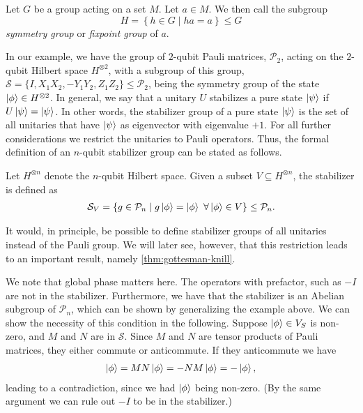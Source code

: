 \begin{defn}\label{defn:fixpointgroup}
  Let $G$ be a group acting on a set $M$. Let $a\in M$. We then call the
  subgroup
  \[ H = \left\{ h \in G \mid ha = a \right\} \leq G \]
  \emph{symmetry group} or \emph{fixpoint group} of $a$.
\end{defn}

In our example, we have the group of $2$-qubit Pauli matrices, $\mathcal{P}_2$,
acting on the $2$-qubit Hilbert space $H^{\otimes 2}$, with a subgroup of this
group, $\mathcal{S} = \{I, X_1X_2, -Y_1Y_2, Z_1Z_2\} \leq \mathcal{P}_2$, being
the symmetry group of the state $\ket{\phi} \in H^{\otimes 2}$.
In general, we say that a unitary $U$ stabilizes a pure state $\ket{\psi}$ if
$U\ket{\psi} = \ket{\psi}$. In other words, the stabilizer group of a pure
state
$\ket{\psi}$ is the set of all unitaries that have $\ket{\psi}$ as eigenvector
with eigenvalue $+1$. For all further considerations we restrict the unitaries
to Pauli operators. Thus, the formal definition of an $n$-qubit stabilizer
group can be stated as follows.

\begin{defn}\label{defn:stabilizergroup}
  Let $H^{\otimes n}$ denote the $n$-qubit Hilbert space. Given a subset $V
  \subseteq H^{\otimes n}$, the stabilizer is defined as
  \begin{align}
    \mathcal{S}_V = \{ g \in \mathcal{P}_n \mid g \ket{\phi} = \ket{\phi} \
    \forall \ket{\phi} \in V \} \leq \mathcal{P}_n
  .\end{align}
\end{defn}

It would, in principle, be possible to define stabilizer groups of all
unitaries instead of the Pauli group. We will later see, however, that this
restriction leads to an important result, namely \cref{thm:gottesman-knill}.

We note that global phase matters here. The operators with prefactor, such as
$-I$ are not in the stabilizer. Furthermore, we have that the stabilizer is an
Abelian subgroup of $\mathcal{P}_n$, which can be shown by generalizing the
example above. We can show the necessity of this condition in the following.
Suppose $\ket{\phi}\in V_S$ is non-zero, and $M$ and $N$ are in $\mathcal{S}$. Since $M$
and $N$ are tensor products of Pauli matrices, they either commute or
anticommute. If they anticommute we have
\begin{align}
  \ket{\phi} = MN\ket{\phi} = -NM\ket{\phi} = -\ket{\phi}
,\end{align}
leading to a contradiction, since we had $\ket{\phi}$ being non-zero. (By the
same argument we can rule out $-I$ to be in the stabilizer.)

